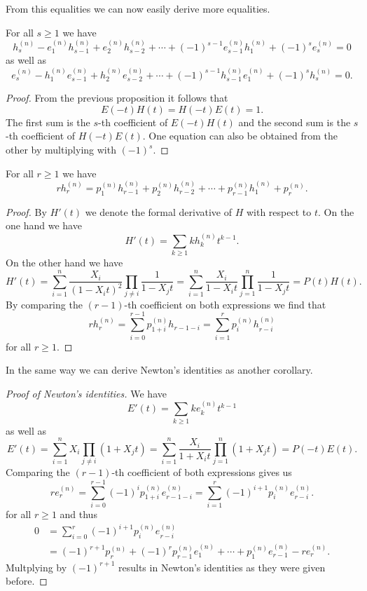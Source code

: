 From this equalities we can now easily derive more equalities.


\begin{cor}
  For all $s \geq 1$ we have
  \[
        h^{(n)}_s
      - e^{(n)}_1 h^{(n)}_{s-1}
      + e^{(n)}_2 h^{(n)}_{s-2}
      + \dotsb
      + (-1)^{s-1} e^{(n)}_{s-1} h^{(n)}_1
      + (-1)^s e^{(n)}_s
    = 0
  \]
  as well as
  \[
        e^{(n)}_s
      - h^{(n)}_1 e^{(n)}_{s-1}
      + h^{(n)}_2 e^{(n)}_{s-2}
      + \dotsb
      + (-1)^{s-1} h^{(n)}_{s-1} e^{(n)}_1
      + (-1)^s h^{(n)}_s
    = 0.
  \]
\end{cor}
\begin{proof}
  From the previous proposition it follows that
  \[
      E(-t)H(t)
    = H(-t)E(t) = 1.
  \]
  The first sum is the $s$-th coefficient of $E(-t)H(t)$ and the second sum is the $s$-th coefficient of $H(-t)E(t)$.
  One equation can also be obtained from the other by multiplying with $(-1)^s$.
\end{proof}


\begin{cor}
  For all $r \geq 1$ we have
  \[
      r h^{(n)}_r
    =   p^{(n)}_1 h^{(n)}_{r-1}
      + p^{(n)}_2 h^{(n)}_{r-2}
      + \dotsb
      + p^{(n)}_{r-1} h^{(n)}_1
      + p^{(n)}_r.
  \]
\end{cor}
\begin{proof}
  By $H'(t)$ we denote the formal derivative of $H$ with respect to $t$.
  On the one hand we have
  \[
      H'(t)
    = \sum_{k \geq 1} k h^{(n)}_k t^{k-1}.
  \]
  On the other hand we have
  \[
      H'(t)
    = \sum_{i=1}^n \frac{X_i}{(1-X_i t)^2} \prod_{j \neq i} \frac{1}{1 - X_j t}
    = \sum_{i=1}^n \frac{X_i}{1 - X_i t} \prod_{j=1}^n \frac{1}{1 - X_j t}
    = P(t) H(t).
  \]
  By comparing the $(r-1)$-th coefficient on both expressions we find that
  \[
      r h^{(n)}_r
    = \sum_{i=0}^{r-1} p^{(n)}_{1+i} h_{r-1-i}
    = \sum_{i=1}^r p^{(n)}_i h^{(n)}_{r-i}
  \]
  for all $r \geq 1$.
\end{proof}


In the same way we can derive Newton’s identities as another corollary.


\begin{proof}[Proof of Newton’s identities]
  We have
  \[
      E'(t)
    = \sum_{k \geq 1} k e^{(n)}_k t^{k-1}
  \]
  as well as
  \[
      E'(t)
    = \sum_{i=1}^n X_i \prod_{j \neq i} (1 + X_j t)
    = \sum_{i=1}^n \frac{X_i}{1 + X_i t} \prod_{j=1}^n (1 + X_j t)
    = P(-t)E(t).
  \]
  Comparing the $(r-1)$-th coefficient of both expressions gives us
  \[
      r e^{(n)}_r
    = \sum_{i=0}^{r-1} (-1)^i p^{(n)}_{1+i} e^{(n)}_{r-1-i}
    = \sum_{i=1}^r (-1)^{i+1} p^{(n)}_i e^{(n)}_{r-i}.
  \]
  for all $r \geq 1$ and thus
  \begin{align*}
        0
    &=  \sum_{i=0}^r (-1)^{i+1} p^{(n)}_i e^{(n)}_{r-i} \\
    &=  (-1)^{r+1} p^{(n)}_r + (-1)^r p^{(n)}_{r-1} e^{(n)}_1 + \dotsb + p^{(n)}_1 e^{(n)}_{r-1} - r e^{(n)}_r.
  \end{align*}
  Multplying by $(-1)^{r+1}$ results in Newton’s identities as they were given before.
\end{proof}



